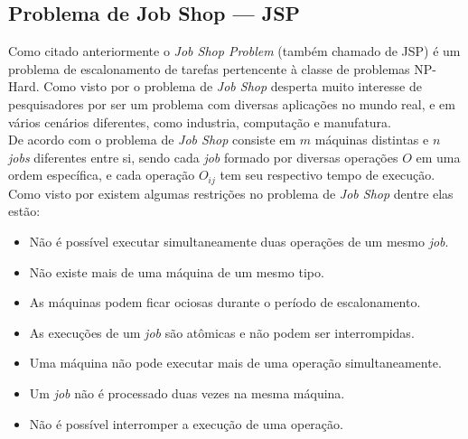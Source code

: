 

    \subsection{Problema de Job Shop — JSP}
            Como citado anteriormente o \textit{Job Shop Problem} (também chamado de JSP) é um problema de escalonamento de tarefas pertencente à classe de problemas NP-Hard. Como visto por \cite{Cheng1996} o problema de \textit{Job Shop} desperta muito interesse de pesquisadores por ser um problema com diversas aplicações no mundo real, e em vários cenários diferentes, como industria, computação e manufatura.\\
            \indent De acordo com \cite{Cheng1996} o problema de \textit{Job Shop} consiste em $m$ máquinas distintas e $n$ \textit{jobs} diferentes entre si, sendo cada \textit{job} formado por diversas operações $O$ em uma ordem específica, e cada operação $O_{ij}$ tem seu respectivo tempo de execução.\\
            \noindent Como visto por \cite{Bagchi1999} existem algumas restrições no problema de \textit{Job Shop} dentre elas estão:
            \begin{itemize}
                \item Não é possível executar simultaneamente duas operações de um mesmo \textit{job}.
                \item Não existe mais de uma máquina de um mesmo tipo.
                \item As máquinas podem ficar ociosas durante o período de escalonamento.
                \item As execuções de um \textit{job} são atômicas e não podem ser interrompidas.
                \item Uma máquina não pode executar mais de uma operação simultaneamente.
                \item Um \textit{job} não é processado duas vezes na mesma máquina.
                \item Não é possível interromper a execução de uma operação.
            \end{itemize}
        
